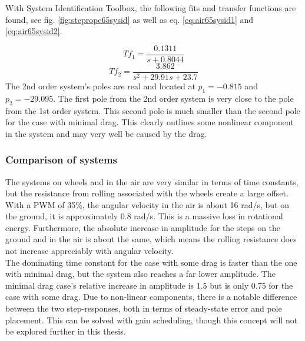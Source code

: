With System Identification Toolbox, the following fits and transfer functions are found, see fig. \ref{fig:steprope65sysid} as well as eq. \ref{eq:air65sysid1} and \ref{eq:air65sysid2}. 


\begin{equation}\label{eq:air65sysid1}
    Tf_1 = \frac{0.1311}{s+0.8044}
\end{equation}
\begin{equation}\label{eq:air65sysid2}
    Tf_2 = \frac{3.862}{s^2 + 29.91s + 23.7}
\end{equation}
The 2nd order system's poles are real and located at $p_1=-0.815$ and $p_2=-29.095$. The first pole from the 2nd order system is very close to the pole from the 1st order system. This second pole is much smaller than the second pole for the case with minimal drag. This clearly outlines some nonlinear component in the system and may very well be caused by the drag. 


\subsubsection{Comparison of systems}
The systems on wheels and in the air are very similar in terms of time constants, but the resistance from rolling associated with the wheels create a large offset. With a PWM of 35\%, the angular velocity in the air is about 16 rad/s, but on the ground, it is approximately 0.8 rad/s. This is a massive loss in rotational energy. Furthermore, the absolute increase in amplitude for the steps on the ground and in the air is about the same, which means the rolling resistance does not increase appreciably with angular velocity. \\ 
The dominating time constant for the case with some drag is faster than the one with minimal drag, but the system also reaches a far lower amplitude. The minimal drag case's relative increase in amplitude is 1.5 but is only 0.75 for the case with some drag. Due to non-linear components, there is a notable difference between the two step-responses, both in terms of steady-state error and pole placement. This can be solved with gain scheduling, though this concept will not be explored further in this thesis. 


